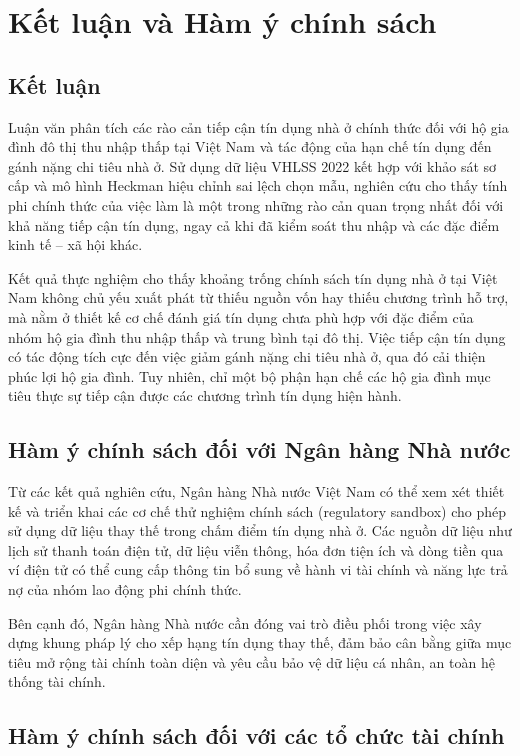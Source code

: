 \documentclass[12pt,a4paper]{report}
\begin{document}
	\chapter{Kết luận và Hàm ý chính sách}
	
	\section{Kết luận}
	
	Luận văn phân tích các rào cản tiếp cận tín dụng nhà ở chính thức đối với hộ gia đình đô thị thu nhập thấp tại Việt Nam và tác động của hạn chế tín dụng đến gánh nặng chi tiêu nhà ở. Sử dụng dữ liệu VHLSS 2022 kết hợp với khảo sát sơ cấp và mô hình Heckman hiệu chỉnh sai lệch chọn mẫu, nghiên cứu cho thấy tính phi chính thức của việc làm là một trong những rào cản quan trọng nhất đối với khả năng tiếp cận tín dụng, ngay cả khi đã kiểm soát thu nhập và các đặc điểm kinh tế – xã hội khác.
	
	Kết quả thực nghiệm cho thấy khoảng trống chính sách tín dụng nhà ở tại Việt Nam không chủ yếu xuất phát từ thiếu nguồn vốn hay thiếu chương trình hỗ trợ, mà nằm ở thiết kế cơ chế đánh giá tín dụng chưa phù hợp với đặc điểm của nhóm hộ gia đình thu nhập thấp và trung bình tại đô thị. Việc tiếp cận tín dụng có tác động tích cực đến việc giảm gánh nặng chi tiêu nhà ở, qua đó cải thiện phúc lợi hộ gia đình. Tuy nhiên, chỉ một bộ phận hạn chế các hộ gia đình mục tiêu thực sự tiếp cận được các chương trình tín dụng hiện hành.
	
	\section{Hàm ý chính sách đối với Ngân hàng Nhà nước}
	
	Từ các kết quả nghiên cứu, Ngân hàng Nhà nước Việt Nam có thể xem xét thiết kế và triển khai các cơ chế thử nghiệm chính sách (regulatory sandbox) cho phép sử dụng dữ liệu thay thế trong chấm điểm tín dụng nhà ở. Các nguồn dữ liệu như lịch sử thanh toán điện tử, dữ liệu viễn thông, hóa đơn tiện ích và dòng tiền qua ví điện tử có thể cung cấp thông tin bổ sung về hành vi tài chính và năng lực trả nợ của nhóm lao động phi chính thức.
	
	Bên cạnh đó, Ngân hàng Nhà nước cần đóng vai trò điều phối trong việc xây dựng khung pháp lý cho xếp hạng tín dụng thay thế, đảm bảo cân bằng giữa mục tiêu mở rộng tài chính toàn diện và yêu cầu bảo vệ dữ liệu cá nhân, an toàn hệ thống tài chính.
	
	\section{Hàm ý chính sách đối với các tổ chức tài chính}
	
\end{document}
